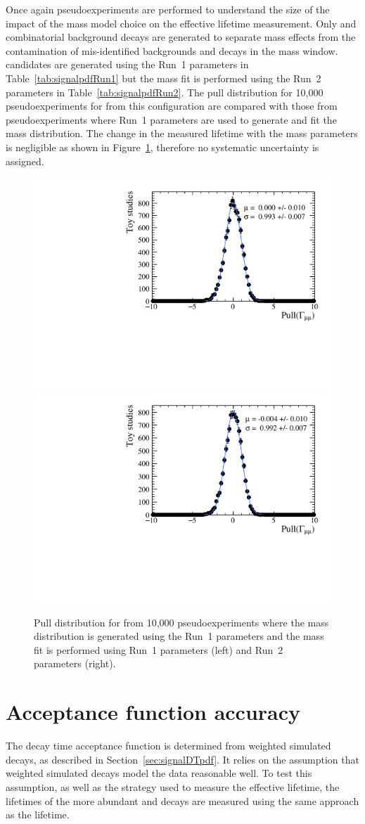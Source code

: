 Once again pseudoexperiments are performed to understand the size of the impact of the mass model choice on the effective lifetime measurement. Only \bsmumu and combinatorial background decays are generated to separate mass \pdf effects from the contamination of mis-identified backgrounds and \bdmumu decays in the mass window. \bsmumu candidates are generated using the Run~1 parameters in Table~\ref{tab:signalpdfRun1} but the mass fit is performed using the Run~2 parameters in Table~\ref{tab:signalpdfRun2}. The pull distribution for 10,000 pseudoexperiments for \Gmumu from this configuration are compared with those from pseudoexperiments where Run~1 parameters are used to generate and fit the mass distribution. The change in the measured lifetime with the mass \pdf parameters is negligible as shown in Figure~\ref{fig:masspdfsyst}, therefore no systematic uncertainty is assigned. 

\begin{figure}[htbp]
    \centering
        \includegraphics[width=0.49 \textwidth]{./Figs/LifetimeSystematics/Gamma_pull_mass_pdf_Run1.pdf}
        \includegraphics[width=0.49 \textwidth]{./Figs/LifetimeSystematics/Gamma_pull_mass_pdf_Run2.pdf}
    \caption{Pull distribution for \Gmumu from 10,000 pseudoexperiments where the \bsmumu mass distribution is generated using the Run~1 parameters and the mass fit is performed using Run~1 parameters (left) and Run~2 parameters (right).}
    \label{fig:masspdfsyst}
\end{figure}


\section{Acceptance function accuracy}
\label{sec:accptsyst}
The decay time acceptance function is determined from weighted simulated decays, as described in Section~\ref{sec:signalDTpdf}. It relies on the assumption that weighted simulated decays model the data reasonable well. To test this assumption, as well as the strategy used to measure the \bsmumu effective lifetime, the lifetimes of the more abundant \bdkpi and \bskk decays are measured using the same approach as the \bsmumu lifetime.

